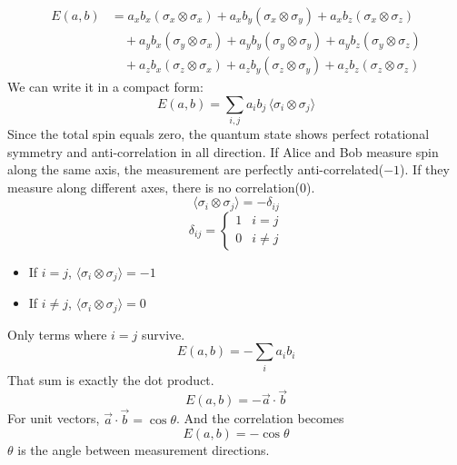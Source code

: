 \documentclass[17pt,a4paper]{extarticle}
\begin{document}
\begin{equation}
\begin{aligned}
E(a,b)&= a_x b_x (\sigma_x \otimes \sigma_x) + a_x b_y (\sigma_x \otimes \sigma_y) + a_x b_z (\sigma_x \otimes \sigma_z) \\
&\quad + a_y b_x (\sigma_y \otimes \sigma_x) + a_y b_y (\sigma_y \otimes \sigma_y) + a_y b_z (\sigma_y \otimes \sigma_z) \\
&\quad + a_z b_x (\sigma_z \otimes \sigma_x) + a_z b_y (\sigma_z \otimes \sigma_y) + a_z b_z (\sigma_z \otimes \sigma_z)
\end{aligned}
\end{equation}
We can write it in a compact form:
\begin{equation}
E(a,b) = \sum_{i,j} a_i b_j \, \langle \sigma_i \otimes \sigma_j \rangle
\end{equation}
Since the total spin equals zero, the quantum state shows perfect rotational symmetry and anti-correlation in all direction. If Alice and Bob measure spin along the same axis, the measurement are perfectly anti-correlated($-1$). If they measure along different axes, there is no correlation($0$).
\[
\langle \sigma_i \otimes \sigma_j \rangle = -\delta_{ij}
\]
\[
\delta_{ij} =
\begin{cases}
1 & i = j \\
0 & i \ne j
\end{cases}
\]

\begin{itemize}
\item If $i=j$, $\langle \sigma_i \otimes \sigma_j \rangle=-1$
\item If $i \neq j$, $\langle \sigma_i \otimes \sigma_j \rangle=0$
\end{itemize}

Only terms where $i=j$ survive.
\begin{equation}
E(a,b) = - \sum_i a_i b_i
\end{equation}
That sum is exactly the dot product.
\begin{equation}
E(a,b) = - \vec{a} \cdot \vec{b}
\end{equation}
For unit vectors, $\vec{a} \cdot \vec{b} = \cos \theta$. And the correlation becomes
\begin{equation}
E(a,b) = - \cos \theta
\end{equation}
$\theta$ is the angle between measurement directions.
\end{document}
